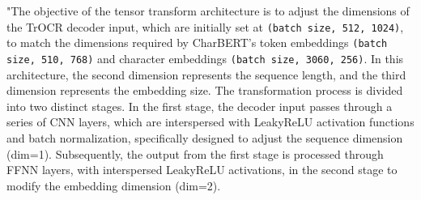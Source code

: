 
"The objective of the tensor transform architecture is to adjust the dimensions of the TrOCR decoder input, which are initially set at \texttt{(batch size, 512, 1024)}, to match the dimensions required by CharBERT's token embeddings \texttt{(batch size, 510, 768)} and character embeddings \texttt{(batch size, 3060, 256)}. In this architecture, the second dimension represents the sequence length, and the third dimension represents the embedding size. The transformation process is divided into two distinct stages. In the first stage, the decoder input passes through a series of CNN layers, which are interspersed with LeakyReLU activation functions and batch normalization, specifically designed to adjust the sequence dimension (dim=1). Subsequently, the output from the first stage is processed through FFNN layers, with interspersed LeakyReLU activations, in the second stage to modify the embedding dimension (dim=2).

